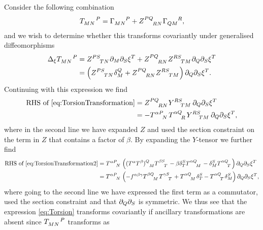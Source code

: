 Consider the following combination \cite{Cederwall:2013naa}
\begin{equation}\label{eq:Torsion}
    \tensor{T}{_{MN}^P} = \tensor{\Gamma}{_{MN}^P}+\tensor{Z}{^{PQ}_{RN}}\tensor{\Gamma}{_{QM}^R},
\end{equation}
and we wish to determine whether this transforms covariantly under generalised diffeomorphisms
\begin{equation}\label{eq:TorsionTransformation}
    \begin{aligned}
        \Delta_\xi\tensor{T}{_M_N^P} &= \tensor{Z}{^{PS}_{TN}}\pd_M\pd_S\xi^T+\tensor{Z}{^{PQ}_{RN}}\tensor{Z}{^{RS}_{TM}}\pd_Q\pd_S\xi^T\\
        &=\left(\tensor{Z}{^{PS}_{TN}}\delta_M^Q+\tensor{Z}{^{PQ}_{RN}}\tensor{Z}{^{RS}_{TM}}\right)\pd_Q\pd_S\xi^T.
    \end{aligned}
\end{equation}
Continuing with this expression we find 
\begin{equation}\label{eq:TorsionTransformation2}
    \begin{aligned}
    \text{RHS of } \eqref{eq:TorsionTransformation} &= \tensor{Z}{^{PQ}_{RN}}\tensor{Y}{^{RS}_{TM}}\pd_Q\pd_S\xi^T\\
    & =  -\tensor{T}{^\alpha^P_N}\tensor{T}{^{\alpha Q}_R}\tensor{Y}{^{RS}_{TM}}\pd_Q\pd_S\xi^T,
    \end{aligned}
\end{equation}
where in the second line we have expanded $Z$ and used the section constraint on the term in $Z$ that contains a factor of $\beta$. By expanding the $Y$-tensor we further find 
\begin{equation}
    \begin{aligned}
        \text{RHS of } \eqref{eq:TorsionTransformation2} &= \tensor{T}{^{\alpha P}_N}\left((T^\alpha T^\beta)\tensor{}{^Q_M}\tensor{T}{^\beta ^S_T}-\beta\delta^S_T\tensor{T}{^{\alpha Q}_M}-\delta^S_M\tensor{T}{^{\alpha Q}_T}\right)\pd_Q\pd_S\xi^T\\
        &= \tensor{T}{^{\alpha P}_N}\left(-f^{\alpha\beta\gamma}\tensor{T}{^{\beta Q}_M}\tensor{T}{^{\gamma S}_T}+\tensor{T}{^{\alpha Q}_M}\delta^S_T-\tensor{T}{^{\alpha Q}_T}\delta^S_M\right)\pd_Q\pd_S\xi^T,\\
    \end{aligned}
\end{equation}
where going to the second line we have expressed the first term as a commutator, used the section constraint and that $\partial_{Q}\partial_S$ is symmetric. We thus see that the expression \eqref{eq:Torsion} transforms covariantly if ancillary transformations are absent since $\tensor{T}{_{MN}^P}$ transforms as
